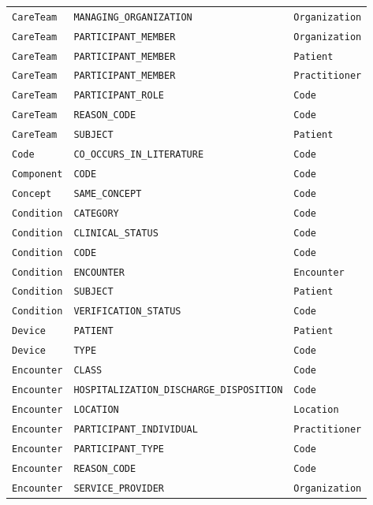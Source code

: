 \begin{longtable}{@{}p{46mm}p{52mm}p{40mm}@{}}
\texttt{CareTeam} & \texttt{MANAGING\_ORGANIZATION} & \texttt{Organization} \\
\texttt{CareTeam} & \texttt{PARTICIPANT\_MEMBER} & \texttt{Organization} \\
\texttt{CareTeam} & \texttt{PARTICIPANT\_MEMBER} & \texttt{Patient} \\
\texttt{CareTeam} & \texttt{PARTICIPANT\_MEMBER} & \texttt{Practitioner} \\
\texttt{CareTeam} & \texttt{PARTICIPANT\_ROLE} & \texttt{Code} \\
\texttt{CareTeam} & \texttt{REASON\_CODE} & \texttt{Code} \\
\texttt{CareTeam} & \texttt{SUBJECT} & \texttt{Patient} \\
\texttt{Code} & \texttt{CO\_OCCURS\_IN\_LITERATURE} & \texttt{Code} \\
\texttt{Component} & \texttt{CODE} & \texttt{Code} \\
\texttt{Concept} & \texttt{SAME\_CONCEPT} & \texttt{Code} \\
\texttt{Condition} & \texttt{CATEGORY} & \texttt{Code} \\
\texttt{Condition} & \texttt{CLINICAL\_STATUS} & \texttt{Code} \\
\texttt{Condition} & \texttt{CODE} & \texttt{Code} \\
\texttt{Condition} & \texttt{ENCOUNTER} & \texttt{Encounter} \\
\texttt{Condition} & \texttt{SUBJECT} & \texttt{Patient} \\
\texttt{Condition} & \texttt{VERIFICATION\_STATUS} & \texttt{Code} \\
\texttt{Device} & \texttt{PATIENT} & \texttt{Patient} \\
\texttt{Device} & \texttt{TYPE} & \texttt{Code} \\
\texttt{Encounter} & \texttt{CLASS} & \texttt{Code} \\
\texttt{Encounter} & \texttt{HOSPITALIZATION\_DISCHARGE\_DISPOSITION} & \texttt{Code} \\
\texttt{Encounter} & \texttt{LOCATION} & \texttt{Location} \\
\texttt{Encounter} & \texttt{PARTICIPANT\_INDIVIDUAL} & \texttt{Practitioner} \\
\texttt{Encounter} & \texttt{PARTICIPANT\_TYPE} & \texttt{Code} \\
\texttt{Encounter} & \texttt{REASON\_CODE} & \texttt{Code} \\
\texttt{Encounter} & \texttt{SERVICE\_PROVIDER} & \texttt{Organization} \\

\end{longtable}
